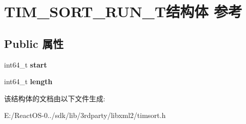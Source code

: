 \hypertarget{struct_t_i_m___s_o_r_t___r_u_n___t}{}\section{T\+I\+M\+\_\+\+S\+O\+R\+T\+\_\+\+R\+U\+N\+\_\+\+T结构体 参考}
\label{struct_t_i_m___s_o_r_t___r_u_n___t}
\subsection*{Public 属性}
\begin{DoxyCompactItemize}
\item 
\mbox{\label{struct_t_i_m___s_o_r_t___r_u_n___t_a4ca7a7b788dda4fa1e5226c076cd8369}} 
int64\+\_\+t {\bfseries start}
\item 
\mbox{\label{struct_t_i_m___s_o_r_t___r_u_n___t_a6817ee376ef544225fff5438ba0ddfc9}} 
int64\+\_\+t {\bfseries length}
\end{DoxyCompactItemize}


该结构体的文档由以下文件生成\+:\begin{DoxyCompactItemize}
\item 
E\+:/\+React\+O\+S-\/0../sdk/lib/3rdparty/libxml2/timsort.\+h\end{DoxyCompactItemize}
